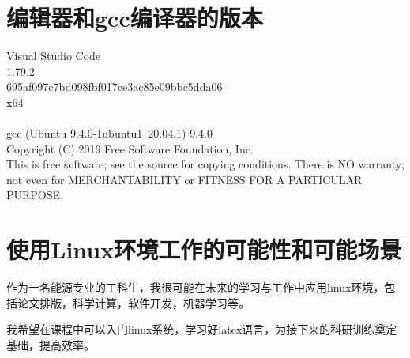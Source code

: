 \documentclass{ctexart}
\begin{document}
\section{编辑器和gcc编译器的版本}
\noindent
Visual Studio Code\\
1.79.2\\
695af097c7bd098fbf017ce3ac85e09bbc5dda06\\
x64\\
\\
gcc (Ubuntu 9.4.0-1ubuntu1~20.04.1) 9.4.0\\
Copyright (C) 2019 Free Software Foundation, Inc.\\
This is free software; see the source for copying conditions.  There is NO
warranty; not even for MERCHANTABILITY or FITNESS FOR A PARTICULAR PURPOSE.\\
\section{使用Linux环境工作的可能性和可能场景}
作为一名能源专业的工科生，我很可能在未来的学习与工作中应用linux环境，包括论文排版，科学计算，软件开发，机器学习等。\par
我希望在课程中可以入门linux系统，学习好latex语言，为接下来的科研训练奠定基础，提高效率。\\
\end{document}
